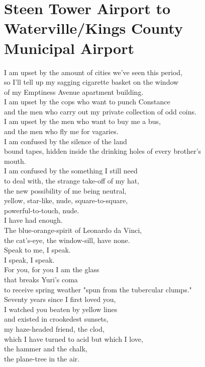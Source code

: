 \documentclass[smalldemyvopaper,11pt,twoside,onecolumn,openright,extrafontsizes]{memoir}
\begin{document}
\chapter{Steen Tower Airport to Waterville/Kings County Municipal Airport}
I am upset by the amount of cities we've seen this period,
\\so I'll tell up my sagging cigarette basket on the window
\\of my Emptiness Avenue apartment building.
\\I am upset by the cops who want to punch Constance
\\and the men who carry out my private collection of odd coins.
\\I am upset by the men who want to buy me a bus,
\\and the men who fly me for vagaries.
\\I am confused by the silence of the land
\\bound tapes, hidden inside the drinking holes of every brother's
\\mouth.
\\I am confused by the something I still need
\\to deal with, the strange take-off of my hat,
\\the new possibility of me being neutral,
\\yellow, star-like, nude, square-to-square,
\\powerful-to-touch, nude.
\\I have had enough.
\\The blue-orange-spirit of Leonardo da Vinci,
\\the cat's-eye, the window-sill, have none.
\\Speak to me, I speak.
\\I speak, I speak.
\\For you, for you I am the glass
\\that breaks Yuri's coma
\\to receive spring weather "spun from the tubercular clumps."
\\Seventy years since I first loved you,
\\I watched you beaten by yellow lines
\\and existed in crookedest sunsets,
\\my haze-headed friend, the clod,
\\which I have turned to acid but which I love,
\\the hammer and the chalk,
\\the plane-tree in the air.
\end{document}
